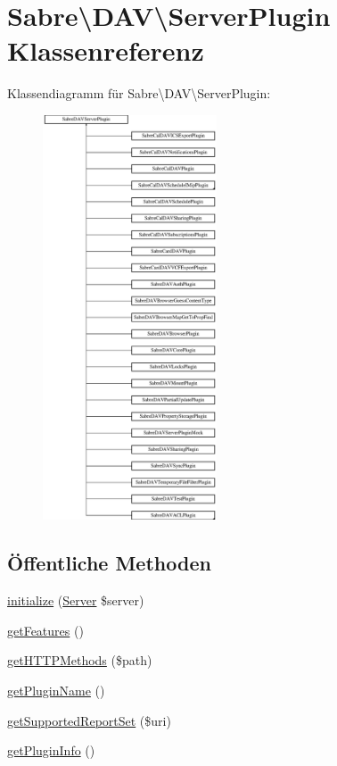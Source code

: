 \hypertarget{class_sabre_1_1_d_a_v_1_1_server_plugin}{}\section{Sabre\textbackslash{}D\+AV\textbackslash{}Server\+Plugin Klassenreferenz}
\label{class_sabre_1_1_d_a_v_1_1_server_plugin}
Klassendiagramm für Sabre\textbackslash{}D\+AV\textbackslash{}Server\+Plugin\+:\begin{figure}[H]
\begin{center}
\leavevmode
\includegraphics[height=12.000000cm]{class_sabre_1_1_d_a_v_1_1_server_plugin}
\end{center}
\end{figure}
\subsection*{Öffentliche Methoden}
\begin{DoxyCompactItemize}
\item 
\mbox{\hyperlink{class_sabre_1_1_d_a_v_1_1_server_plugin_aeb2fadb199224163c831cf5f04a1373e}{initialize}} (\mbox{\hyperlink{class_sabre_1_1_d_a_v_1_1_server}{Server}} \$server)
\item 
\mbox{\hyperlink{class_sabre_1_1_d_a_v_1_1_server_plugin_a8681879236fa589ad92f0614682f28a7}{get\+Features}} ()
\item 
\mbox{\hyperlink{class_sabre_1_1_d_a_v_1_1_server_plugin_a1c68444d4e319cfd8f839380602fbbd3}{get\+H\+T\+T\+P\+Methods}} (\$path)
\item 
\mbox{\hyperlink{class_sabre_1_1_d_a_v_1_1_server_plugin_a6699c5a1e4c8385d2eff910b7295ebaf}{get\+Plugin\+Name}} ()
\item 
\mbox{\hyperlink{class_sabre_1_1_d_a_v_1_1_server_plugin_af0a442be6b6758ebf8b05dbc4720137b}{get\+Supported\+Report\+Set}} (\$uri)
\item 
\mbox{\hyperlink{class_sabre_1_1_d_a_v_1_1_server_plugin_ac1a279060733c3a19d4fd1aaab00d01c}{get\+Plugin\+Info}} ()
\end{DoxyCompactItemize}


